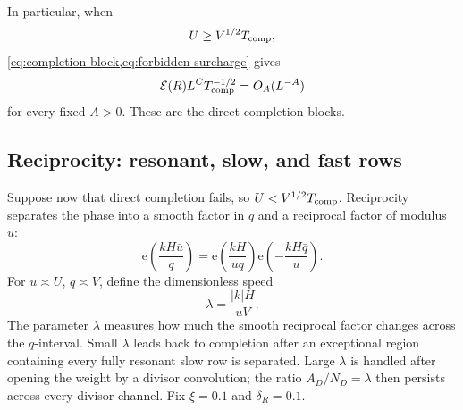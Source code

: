 \documentclass[11pt]{article}
\theoremstyle{definition}
\theoremstyle{remark}
\newcommand{\Ecal}{\mathcal E}
\newcommand{\e}{\mathrm e}
\newcommand{\1}{\mathbf 1}
\begin{document}
In particular, when
\[
U\ge V^{1/2}T_{\rm comp},
\]
\cref{eq:completion-block,eq:forbidden-surcharge} gives
\[
\Ecal(R)L^CT_{\rm comp}^{-1/2}=O_A(L^{-A})
\]
for every fixed $A>0$.  These are the direct-completion blocks.

\subsection{Reciprocity: resonant, slow, and fast rows}\label{sec:reciprocal}
Suppose now that direct completion fails, so $U<V^{1/2}T_{\rm comp}$.  Reciprocity separates the phase into a smooth factor in $q$ and a reciprocal factor of modulus $u$:
\begin{equation}\label{eq:reciprocity}
\e\!\left(\frac{kH\bar u}{q}\right)
 =\e\!\left(\frac{kH}{uq}\right)
  \e\!\left(-\frac{kH\bar q}{u}\right).
\end{equation}
For $u\asymp U$, $q\asymp V$, define the dimensionless speed
\begin{equation}\label{eq:lambda}
\lambda=\frac{|k|H}{uV}.
\end{equation}
The parameter $\lambda$ measures how much the smooth reciprocal factor changes across the $q$-interval.  Small $\lambda$ leads back to completion after an exceptional region containing every fully resonant slow row is separated.  Large $\lambda$ is handled after opening the weight by a divisor convolution; the ratio $A_D/N_D=\lambda$ then persists across every divisor channel.  Fix $\xi=0.1$ and $\delta_R=0.1$.
\end{document}
